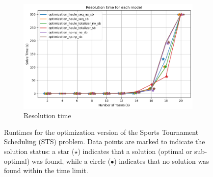 \begin{figure}[H]
    \centering
    \begin{subfigure}{0.49\linewidth}
        \centering
        \includegraphics[width=\linewidth]{imgs/output.png}
        \caption{Resolution time}
    \end{subfigure}
    \caption{Runtimes for the optimization version of the Sports Tournament Scheduling (STS) problem. Data points are marked to indicate the solution status: a star ($\star$) indicates that a solution (optimal or sub-optimal) was found, while a circle ($\bullet$) indicates that no solution was found within the time limit.}
\end{figure}








